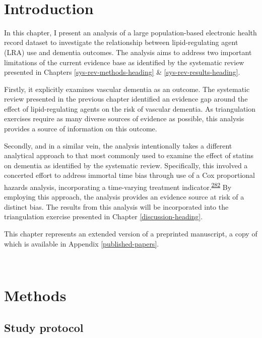 \documentclass[a4paper, twoside]{templates/ociamthesis}
\begin{document}
~

\hypertarget{introduction-2}{%
\section{Introduction}\label{introduction-2}}

In this chapter, I present an analysis of a large population-based electronic health record dataset to investigate the relationship between lipid-regulating agent (LRA) use and dementia outcomes. The analysis aims to address two important limitations of the current evidence base as identified by the systematic review presented in Chapters \ref{sys-rev-methods-heading} \& \ref{sys-rev-results-heading}.

Firstly, it explicitly examines vascular dementia as an outcome. The systematic review presented in the previous chapter identified an evidence gap around the effect of lipid-regulating agents on the risk of vascular dementia. As triangulation exercises require as many diverse sources of evidence as possible, this analysis provides a source of information on this outcome.

Secondly, and in a similar vein, the analysis intentionally takes a different analytical approach to that most commonly used to examine the effect of statins on dementia as identified by the systematic review. Specifically, this involved a concerted effort to address immortal time bias through use of a Cox proportional hazards analysis, incorporating a time-varying treatment indicator.\textsuperscript{\protect\hyperlink{ref-suissa2008}{282}} By employing this approach, the analysis provides an evidence source at risk of a distinct bias. The results from this analysis will be incorporated into the triangulation exercise presented in Chapter \ref{discussion-heading}.

This chapter represents an extended version of a preprinted manuscript, a copy of which is available in Appendix \ref{published-papers}.

~

\hypertarget{methods-1}{%
\section{Methods}\label{methods-1}}

\hypertarget{study-protocol}{%
\subsection{Study protocol}\label{study-protocol}}
\end{document}
